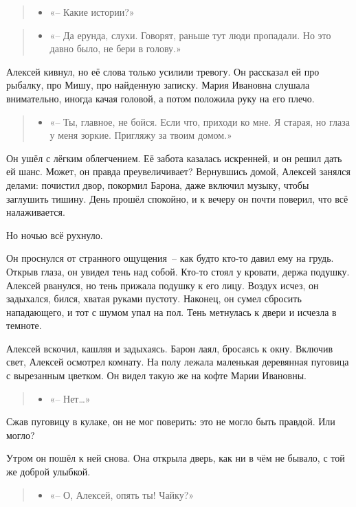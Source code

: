 \documentclass[12pt,a4paper]{book}
\newenvironment{dialogue}{\begin{quote}\itshape\begin{itemize}\item[]}{\end{itemize}\end{quote}}
\begin{document}
\begin{dialogue}
«-- Какие истории?»
\end{dialogue}

\begin{dialogue}
«-- Да ерунда, слухи. Говорят, раньше тут люди пропадали. Но это давно было, не бери в голову.»
\end{dialogue}

Алексей кивнул, но её слова только усилили тревогу. Он рассказал ей про рыбалку, про Мишу, про найденную записку. Мария Ивановна слушала внимательно, иногда качая головой, а потом положила руку на его плечо.

\begin{dialogue}
«-- Ты, главное, не бойся. Если что, приходи ко мне. Я старая, но глаза у меня зоркие. Пригляжу за твоим домом.»
\end{dialogue}

Он ушёл с лёгким облегчением. Её забота казалась искренней, и он решил дать ей шанс. Может, он правда преувеличивает? Вернувшись домой, Алексей занялся делами: почистил двор, покормил Барона, даже включил музыку, чтобы заглушить тишину. День прошёл спокойно, и к вечеру он почти поверил, что всё налаживается.

Но ночью всё рухнуло.

Он проснулся от странного ощущения~-- как будто кто-то давил ему на грудь. Открыв глаза, он увидел тень над собой. Кто-то стоял у кровати, держа подушку. Алексей рванулся, но тень прижала подушку к его лицу. Воздух исчез, он задыхался, бился, хватая руками пустоту. Наконец, он сумел сбросить нападающего, и тот с шумом упал на пол. Тень метнулась к двери и исчезла в темноте.

Алексей вскочил, кашляя и задыхаясь. Барон лаял, бросаясь к окну. Включив свет, Алексей осмотрел комнату. На полу лежала маленькая деревянная пуговица с вырезанным цветком. Он видел такую же на кофте Марии Ивановны.

\begin{dialogue}
«-- Нет\ldots»
\end{dialogue}

Сжав пуговицу в кулаке, он не мог поверить: это не могло быть правдой. Или могло?

Утром он пошёл к ней снова. Она открыла дверь, как ни в чём не бывало, с той же доброй улыбкой.

\begin{dialogue}
«-- О, Алексей, опять ты! Чайку?»
\end{dialogue}
\end{document}
